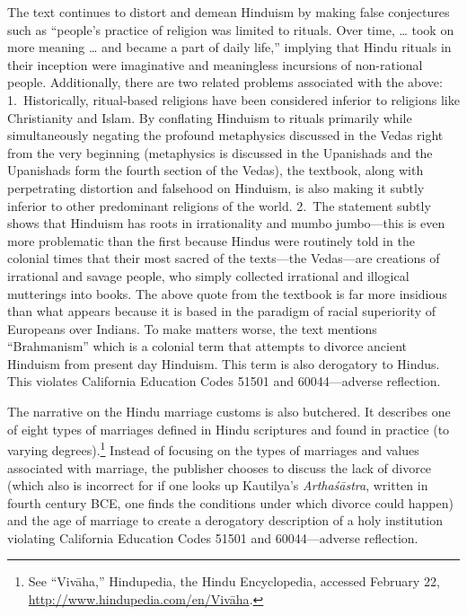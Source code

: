 The text continues to distort and demean Hinduism by making false conjectures such as “people’s practice of religion was limited to rituals. Over time, … took on more meaning … and became a part of daily life,” implying that Hindu rituals in their inception were imaginative and meaningless incursions of non-rational people. Additionally, there are two related problems associated with the above: 1.\ Historically, ritual-based religions have been considered inferior to religions like Christianity and Islam. By conflating Hinduism to rituals primarily while simultaneously negating the profound metaphysics discussed in the Vedas right from the very beginning (metaphysics is discussed in the Upanishads and the Upanishads form the fourth section of the Vedas), the textbook, along with perpetrating distortion and falsehood on Hinduism, is also making it subtly inferior to other predominant religions of the world. 2.\ The statement subtly shows that Hinduism has roots in irrationality and mumbo jumbo—this is even more problematic than the first because Hindus were routinely told in the colonial times that their most sacred of the texts—the Vedas—are creations of irrational and savage people, who simply collected irrational and illogical mutterings into books. The above quote from the textbook is far more insidious than what appears because it is based in the paradigm of racial superiority of Europeans over Indians. To make matters worse, the text mentions “Brahmanism” which is a colonial term that attempts to divorce ancient Hinduism from present day Hinduism. This term is also derogatory to Hindus. This violates California Education Codes 51501 and 60044—adverse reflection.  

The narrative on the Hindu marriage customs is also butchered. It describes one of eight types of marriages defined in Hindu scriptures and found in practice (to varying degrees).\footnote{See “Vivāha,” Hindupedia, the Hindu Encyclopedia, accessed 	February 22, \url{http://www.hindupedia.com/en/Vivāha}.} Instead of focusing on the types of marriages and values associated with marriage, the publisher chooses to discuss the lack of divorce (which also is incorrect for if one looks up Kautilya’s \textit{Arthaśāstra}, written in fourth century BCE, one finds the conditions under which divorce could happen) and the age of marriage to create a derogatory description of a holy institution violating California Education Codes 51501 and 60044—adverse reflection.  

